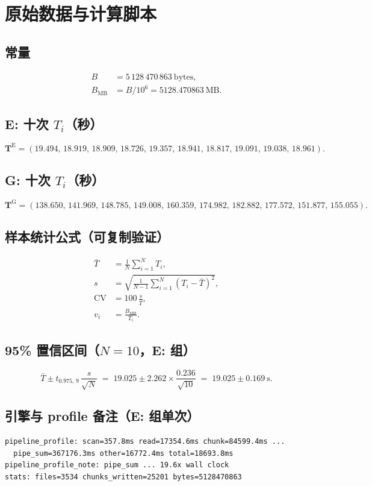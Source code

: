 \section{原始数据与计算脚本}\label{sec:appendix-raw}

\subsection{常量}
\begin{align*}
  B &= 5\,128\,470\,863\ \text{bytes}, \\
  B_{\mathrm{MB}} &= B/10^{6} = 5128.470863\ \text{MB}.
\end{align*}

\subsection{E: 十次 $T_i$（秒）}
\[
  \mathbf{T}^{\mathrm{E}} = (19.494,\,18.919,\,18.909,\,18.726,\,19.357,\,18.941,\,18.817,\,19.091,\,19.038,\,18.961).
\]

\subsection{G: 十次 $T_i$（秒）}
\[
  \mathbf{T}^{\mathrm{G}} = (138.650,\,141.969,\,148.785,\,149.008,\,160.359,\,174.982,\,182.882,\,177.572,\,151.877,\,155.055).
\]

\subsection{样本统计公式（可复制验证）}
\begin{align}
  \bar{T} &= \frac{1}{N}\sum_{i=1}^{N} T_i, \\
  s &= \sqrt{\frac{1}{N-1}\sum_{i=1}^{N}(T_i-\bar{T})^2}, \\
  \mathrm{CV} &= 100\,\frac{s}{\bar{T}}, \\
  v_i &= \frac{B_{\mathrm{MB}}}{T_i}.
\end{align}

\subsection{95\% 置信区间（$N=10$，E: 组）}
\[
  \bar{T} \pm t_{0.975,\,9}\,\frac{s}{\sqrt{N}}
  \;=\; 19.025 \pm 2.262\times\frac{0.236}{\sqrt{10}}
  \;=\; 19.025 \pm 0.169\ \text{s}.
\]

\subsection{引擎与 profile 备注（E: 组单次）}
\begin{verbatim}
pipeline_profile: scan=357.8ms read=17354.6ms chunk=84599.4ms ...
  pipe_sum=367176.3ms other=16772.4ms total=18693.8ms
pipeline_profile_note: pipe_sum ... 19.6x wall clock
stats: files=3534 chunks_written=25201 bytes=5128470863
\end{verbatim}

